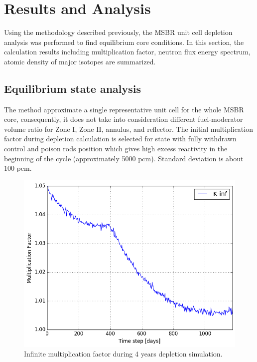\documentclass{anstrans}
\begin{document}
\section{Results and Analysis}

Using the methodology described previously, the \gls{MSBR} unit cell depletion 
analysis was performed to find equilibrium core conditions. In this section, 
the calculation results including multiplication factor, neutron flux energy 
spectrum, atomic density of major isotopes are summarized.

\subsection{Equilibrium state analysis}

The method approximate a single representative unit cell for the whole 
\gls{MSBR} core, consequently, it does not take into consideration different 
fuel-moderator volume ratio for Zone I, Zone II, annulus, and reflector. The 
initial multiplication factor during depletion calculation is selected for 
state with fully withdrawn control and poison rods position which gives high 
excess reactivity in the beginning of the cycle (approximately 5000 pcm). 
Standard deviation is about 100 pcm.

\begin{figure}[htbp!] %
        \centering
        \includegraphics[width=1.03\linewidth]{keff.png}
        \caption{Infinite multiplication factor during 4 years depletion 
        simulation.}
        \label{fig:keff}
\end{figure}
\end{document}
